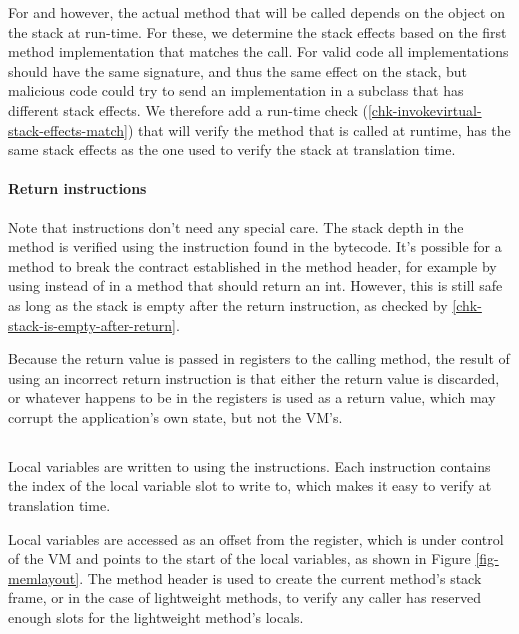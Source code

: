 For  and  however, the actual method that will be called depends on the object on the stack at run-time. For these, we determine the stack effects based on the first method implementation that matches the call. For valid code all implementations should have the same signature, and thus the same effect on the stack, but malicious code could try to send an implementation in a subclass that has different stack effects. We therefore add a run-time check (\ref{chk-invokevirtual-stack-effects-match}) that will verify the method that is called at runtime, has the same stack effects as the one used to verify the stack at translation time.

\paragraph{Return instructions}
Note that  instructions don't need any special care. The stack depth in the method is verified using the instruction found in the bytecode. It's possible for a method to break the contract established in the method header, for example by using  instead of  in a method that should return an int. However, this is still safe as long as the stack is empty after the return instruction, as checked by \ref{chk-stack-is-empty-after-return}.

Because the return value is passed in registers to the calling method, the result of using an incorrect return instruction is that either the return value is discarded, or whatever happens to be in the registers is used as a return value, which may corrupt the application's own state, but not the VM's.

\subsection{}
Local variables are written to using the  instructions. Each  instruction contains the index of the local variable slot to write to, which makes it easy to verify at translation time.

Local variables are accessed as an offset from the  register, which is under control of the VM and points to the start of the local variables, as shown in Figure \ref{fig-memlayout}. The method header is used to create the current method's stack frame, or in the case of lightweight methods, to verify any caller has reserved enough slots for the lightweight method's locals.

